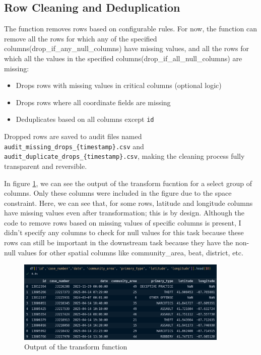 \documentclass[12pt]{article}
\begin{document}
\subsection*{Row Cleaning and Deduplication}
The function removes rows based on configurable rules. For now, the function can remove all the rows for which any of the specified columns(drop\_if\_any\_null\_columns) have missing values, and all the rows for which all the values in the specified columns(drop\_if\_all\_null\_columns) are missing:
\begin{itemize}
    \item Drops rows with missing values in critical columns (optional logic)
    \item Drops rows where all coordinate fields are missing
    \item Deduplicates based on all columns except \texttt{id}
\end{itemize}

Dropped rows are saved to audit files named \texttt{audit\_missing\_drops\_\{timestamp\}.csv} and \texttt{audit\_duplicate\_drops\_\{timestamp\}.csv}, making the cleaning process fully transparent and reversible.

In figure \ref{fig:transform_output}, we can see the output of the transform fucntion for a select group of columns. Only these columns were included in the figure due to the space constraint. Here, we can see that, for some rows, latitude and longitude columns have missing values even after transformation; this is by design. Although the code to remove rows based on missing values of specific columns is present, I didn't specify any columns to check for null values for this task because these rows can still be important in the downstream task because they have the non-null values for other spatial columns like community\_area, beat, district, etc.

\begin{figure}[h!]
    \centering
    \includegraphics[width=0.9\textwidth]{figures/transformation_output.png}
    \caption{Output of the transform function}
    \label{fig:transform_output}
\end{figure}
\end{document}
